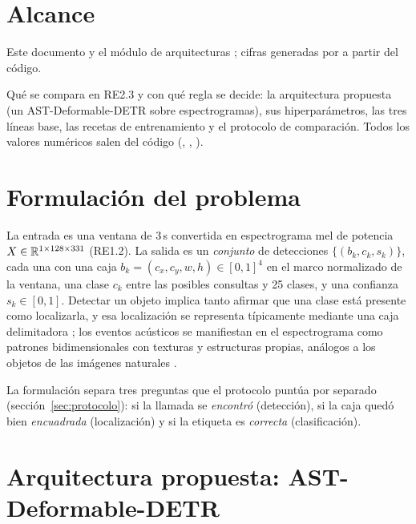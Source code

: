 \documentclass[12pt,a4paper]{article}
\begin{document}

\section{Alcance}

 Este documento y el módulo de arquitecturas
; cifras generadas por
 a partir del código.

 Qué se compara en RE2.3 y con qué regla se decide: la arquitectura
propuesta (un AST-Deformable-DETR sobre espectrogramas), sus hiperparámetros, las tres líneas
base, las recetas de entrenamiento y el protocolo de comparación. Todos los valores numéricos
salen del código (, , ).

\section{Formulación del problema}

La entrada es una ventana de 3\,s convertida en espectrograma mel de potencia
$X \in \mathbb{R}^{1 \times 128 \times 331}$ (RE1.2). La salida es un \emph{conjunto} de
detecciones $\{(b_k, c_k, s_k)\}$, cada una con una caja $b_k = (c_x, c_y, w, h) \in [0,1]^4$
en el marco normalizado de la ventana, una clase $c_k$ entre las \nQueries{} posibles
consultas y 25 clases, y una confianza $s_k \in [0,1]$. Detectar un objeto implica tanto
afirmar que una clase está presente como localizarla, y esa localización se representa
típicamente mediante una caja delimitadora \citep{lin_2014}; los eventos acústicos se
manifiestan en el espectrograma como patrones bidimensionales con texturas y estructuras
propias, análogos a los objetos de las imágenes naturales \citep{pham_eventness_2018}.

La formulación separa tres preguntas que el protocolo puntúa por separado
(sección~\ref{sec:protocolo}): si la llamada se \emph{encontró} (detección), si la caja quedó
bien \emph{encuadrada} (localización) y si la etiqueta es \emph{correcta} (clasificación).

\section{Arquitectura propuesta: AST-Deformable-DETR}
\label{sec:arquitectura}
\end{document}
